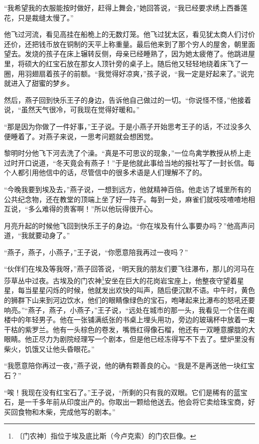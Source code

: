 \documentclass[12pt,UTF-8,openany]{ctexbook}
\begin{document}
\begin{normalsize}
    “我希望我的衣服能按时做好，赶得上舞会，”她回答说，“我已经要求绣上西番莲花，只是裁缝太慢了。”
    
    他飞过河流，看见高挂在船桅上的无数灯笼。他飞过犹太区，看见犹太商人们讨价还价，还把钱币放在铜制的天平上称重量。最后他来到了那个穷人的屋舍，朝里面望去。发烧的孩子在床上辗转反侧，母亲已经睡熟了，因为她太疲倦了。他跳进屋里，将硕大的红宝石放在那女人顶针旁的桌子上。随后他又轻轻地绕着床飞了一圈，用羽翅扇着孩子的前额。“我觉得好凉爽，”孩子说，“我一定是好起来了。”说完就进入了甜蜜的梦乡。
    
    然后，燕子回到快乐王子的身边，告诉他自己做过的一切。“你说怪不怪，”他接着说，“虽然天气很冷，可我现在觉得好暖和。”
    
    “那是因为你做了一件好事，”王子说。于是小燕子开始思考王子的话，不过没多久便睡着了。对燕子来说，一思考问题就会想困觉。
    
    黎明时分他飞下河去洗了个澡。“真是不可思议的现象，”一位鸟禽学教授从桥上走过时开口说道，“冬天竟会有燕子！”于是他就此事给当地的报社写了一封长信。每个人都引用他信中的话，尽管信中的很多术语是人们理解不了的。
    
    “今晚我要到埃及去，”燕子说，一想到远方，他就精神百倍。他走访了城里所有的公共纪念物，还在教堂的顶端上坐了好一阵子。每到一处，麻雀们就吱吱喳喳地相互说，“多么难得的贵客啊！”所以他玩得很开心。
    
    月亮升起的时候他飞回到快乐王子的身边。“你在埃及有什么事要办吗？”他高声问道，“我就要动身了。”
    
    “燕子，燕子，小燕子，”王子说，“你愿意陪我再过一夜吗？”
    
    “伙伴们在埃及等我呀，”燕子回答说，“明天我的朋友们要飞往瀑布，那儿的河马在莎草丛中过夜。古埃及的门农神\footnote{〔门农神〕指位于埃及底比斯（今卢克索）的门农巨像。}安坐在巨大的花岗岩宝座上，他整夜守望着星星，每当星星闪烁的时候，他就发出欢快的叫声，随后便沉默不语。中午时，黄色的狮群下山来到河边饮水，他们的眼睛像绿色的宝石，咆哮起来比瀑布的怒吼还要响亮。”“燕子，燕子，小燕子，”王子说，“远处在城市的那一头，我看见一个住在阁楼中的年轻男子。他在一张铺满纸张的书桌上埋头用功，旁边的玻璃杯中放着一束干枯的紫罗兰。他有一头棕色的卷发，嘴唇红得像石榴，他还有一双睡意朦胧的大眼睛。他正尽力为剧院经理写一个剧本，但是他已经冻得写不下去了。壁炉里没有柴火，饥饿又让他头昏眼花。”
    
    “我愿意陪你再过一夜，”燕子说，他的确有颗善良的心。“我是不是再送他一块红宝石？”
    
    “唉！我现在没有红宝石了。”王子说，“所剩的只有我的双眼。它们是稀有的蓝宝石，是一千多年前从印度出产的。你取出一颗给他送去。他会将它卖给珠宝商，好买回食物和木柴，完成他写的剧本。”
    

\end{normalsize}
\end{document}
